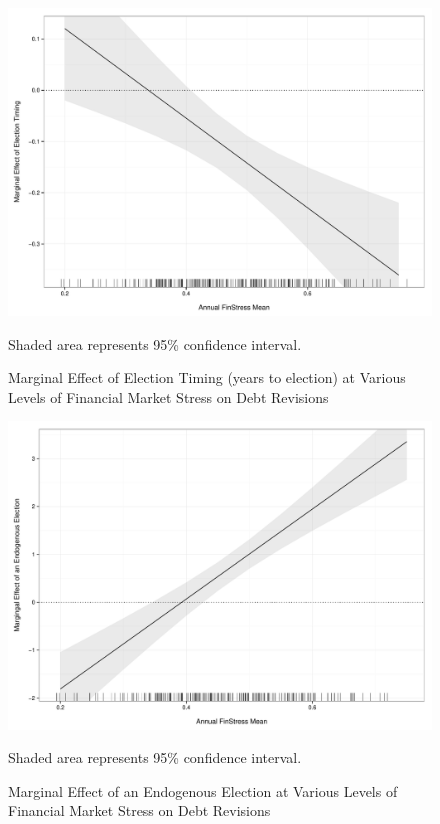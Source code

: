 \documentclass[]{article}
\begin{document}
\begin{figure}
    \caption{Marginal Effect of Election Timing (years to election) at Various Levels of Financial Market Stress on Debt Revisions}
    \label{me_finstress_elect}

    \begin{center}
        \includegraphics[scale=0.4]{figures/finstress_elect_me.pdf}
    \end{center}

	{\scriptsize{Shaded area represents 95\% confidence interval.}}

\end{figure}

\begin{figure}
    \caption{Marginal Effect of an Endogenous Election at Various Levels of Financial Market Stress on Debt Revisions}
    \label{me_finstress_endog_elect}

    \begin{center}
        \includegraphics[scale=0.4]{figures/finstress_endog_elect_me.pdf}
    \end{center}

	{\scriptsize{Shaded area represents 95\% confidence interval.}}

\end{figure}
\end{document}
